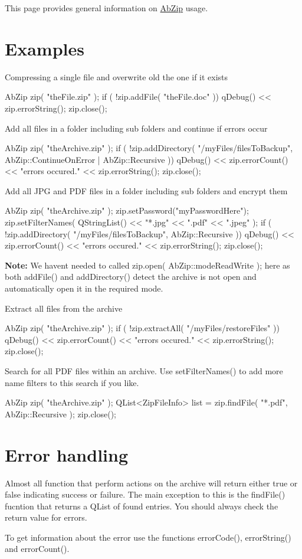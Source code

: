 This page provides general information on \hyperlink{class_ab_zip}{Ab\+Zip} usage.\hypertarget{usage_examples}{}\section{Examples}\label{usage_examples}
Compressing a single file and overwrite old the one if it exists \begin{DoxyVerb}   AbZip zip( "theFile.zip" );
   if ( !zip.addFile( "theFile.doc" ))
    qDebug() << zip.errorString();
   zip.close();
\end{DoxyVerb}


Add all files in a folder including sub folders and continue if errors occur \begin{DoxyVerb}   AbZip zip( "theArchive.zip" );
   if ( !zip.addDirectory( "/myFiles/filesToBackup", AbZip::ContinueOnError | AbZip::Recursive ))
    qDebug() << zip.errorCount() << "errors occured.\n" << zip.errorString();
   zip.close();
\end{DoxyVerb}


Add all J\+PG and P\+DF files in a folder including sub folders and encrypt them \begin{DoxyVerb}   AbZip zip( "theArchive.zip" );
   zip.setPassword("myPasswordHere");
   zip.setFilterNames( QStringList() << "*.jpg" << ".pdf" << ".jpeg" );
   if ( !zip.addDirectory( "/myFiles/filesToBackup", AbZip::Recursive ))
    qDebug() << zip.errorCount() << "errors occured.\n" << zip.errorString();
   zip.close();
\end{DoxyVerb}


{\bfseries Note\+:} We haven\textquotesingle{}t needed to called zip.\+open( Ab\+Zip\+::mode\+Read\+Write ); here as both add\+File() and add\+Directory() detect the archive is not open and automatically open it in the required mode.

Extract all files from the archive \begin{DoxyVerb}   AbZip zip( "theArchive.zip" );
   if ( !zip.extractAll( "/myFiles/restoreFiles" ))
    qDebug() << zip.errorCount() << "errors occured.\n" << zip.errorString();
   zip.close();
\end{DoxyVerb}


Search for all P\+DF files within an archive. Use set\+Filter\+Names() to add more name filters to this search if you like. \begin{DoxyVerb}   AbZip zip( "theArchive.zip" );
   QList<ZipFileInfo> list = zip.findFile( "*.pdf", AbZip::Recursive );
   zip.close();
\end{DoxyVerb}
\hypertarget{usage_error-handling}{}\section{Error handling}\label{usage_error-handling}
Almost all function that perform actions on the archive will return either {\ttfamily true} or {\ttfamily false} indicating success or failure. The main exception to this is the find\+File() fucntion that returns a Q\+List of found entries. You should always check the return value for errors.

To get information about the error use the functions error\+Code(), error\+String() and error\+Count(). 